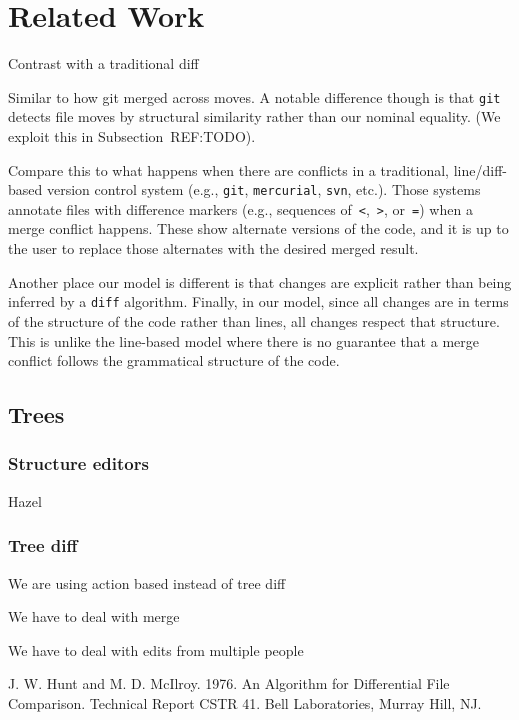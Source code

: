 
\section{Related Work}%
\label{sec:Related Work}

Contrast with a traditional diff

Similar to how git merged across moves.
A notable difference though is that \texttt{git} detects
file moves by structural similarity rather than
our nominal equality.
(We exploit this in Subsection~REF:TODO).

Compare this to what happens when there are conflicts in a traditional,
line/diff-based version control system (e.g., \texttt{git}, \texttt{mercurial}, \texttt{svn}, etc.).
Those systems annotate files with difference markers (e.g., sequences of~\texttt{<},~\texttt{>}, or~\texttt{=})
when a merge conflict happens.
These show alternate versions of the code, and it is up to the user
to replace those alternates with the desired merged result.

Another place our model is different
is that changes are explicit rather than being inferred by a \texttt{diff} algorithm.
Finally, in our model, since all changes are in terms of
the structure of the code rather than lines,
all changes respect that structure.
This is unlike the line-based model where there is no guarantee
that a merge conflict follows the grammatical structure of the code.

\subsection{Trees}

\subsubsection{Structure editors}

Hazel~\citep{Omar:2019:10.1145/3290327}

\subsubsection{Tree diff}

We are using action based instead of tree diff

We have to deal with merge

We have to deal with edits from multiple people

J. W. Hunt and M. D. McIlroy. 1976. An Algorithm for Differential File Comparison. Technical Report CSTR 41. Bell Laboratories, Murray Hill, NJ.


